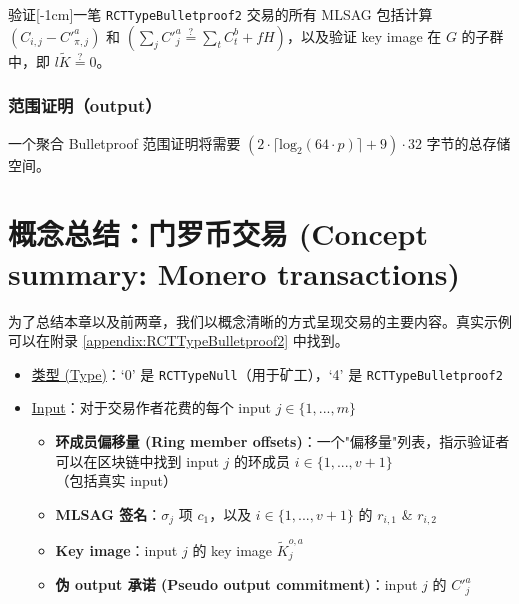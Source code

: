 {验证[-1cm]一笔 {\tt RCTTypeBulletproof2} 交易的所有 MLSAG 包括计算 \( (C_{i, j} - C'^a_{\pi, j}) \) 和 \( (\sum_j C'^a_{j} \stackrel{?}{=} \sum_t C^b_{t} + f H)\)，以及验证 key image 在 $G$ 的子群中，即 $l \tilde{K} \stackrel{?}{=} 0$。

\subsubsection*{范围证明（output）}

一个聚合 Bulletproof 范围证明将需要 $(2 \cdot \lceil \textrm{log}_2(64 \cdot p) \rceil + 9) \cdot 32$ 字节的总存储空间。



\newpage
\section{概念总结：门罗币交易 (Concept summary: Monero transactions)}
\label{sec:transaction_summary}

为了总结本章以及前两章，我们以概念清晰的方式呈现交易的主要内容。真实示例可以在附录 \ref{appendix:RCTTypeBulletproof2} 中找到。

\begin{itemize}
    \item \underline{类型 (Type)}：`0' 是 {\tt RCTTypeNull}（用于矿工），`4' 是 {\tt RCTTypeBulletproof2} %
    \item \underline{Input}：对于交易作者花费的每个 input $j \in \{1,...,m\}$
    \begin{itemize}
        \item \textbf{环成员偏移量 (Ring member offsets)}：一个"偏移量"列表，指示验证者可以在区块链中找到 input $j$ 的环成员 $i \in \{1,...,v+1\}$（包括真实 input）
        \item \textbf{MLSAG 签名}：$\sigma_j$ 项 $c_1$，以及 $i \in \{1,...,v+1\}$ 的 $r_{i,1}$ \& $r_{i,2}$
        \item \textbf{Key image}：input $j$ 的 key image $\tilde{K}^{o,a}_j$
        \item \textbf{伪 output 承诺 (Pseudo output commitment)}：input $j$ 的 $C'^{a}_j$
    \end{itemize}
    

\end{itemize}}
